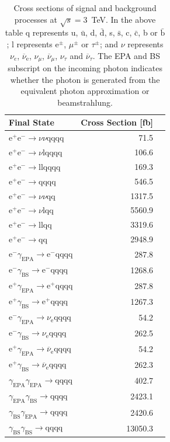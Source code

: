\begin{table}[h!]
\centering
\begin{tabular}{ l r r }
\hline
Final State & Cross Section [fb]  \\ 
\hline
$\text{e}^{+}\text{e}^{-} \rightarrow \nu{\nu}\text{qqqq}$ & 71.5 \\
$\text{e}^{+}\text{e}^{-} \rightarrow \nu\text{lqqqq}$ & 106.6 \\
$\text{e}^{+}\text{e}^{-} \rightarrow \text{llqqqq}$ & 169.3 \\
$\text{e}^{+}\text{e}^{-} \rightarrow \text{qqqq}$ & 546.5 \\
$\text{e}^{+}\text{e}^{-} \rightarrow \nu{\nu}\text{qq}$ & 1317.5 \\
$\text{e}^{+}\text{e}^{-} \rightarrow \nu\text{lqq}$ & 5560.9 \\
$\text{e}^{+}\text{e}^{-} \rightarrow \text{llqq}$ & 3319.6 \\
$\text{e}^{+}\text{e}^{-} \rightarrow \text{qq}$ & 2948.9 \\
$\text{e}^{-}\gamma_{\text{EPA}} \rightarrow \text{e}^{-}\text{qqqq}$ & 287.8 \\
$\text{e}^{-}\gamma_{\text{BS}} \rightarrow \text{e}^{-}\text{qqqq}$ & 1268.6 \\
$\text{e}^{+}\gamma_{\text{EPA}} \rightarrow \text{e}^{+}\text{qqqq}$ & 287.8 \\
$\text{e}^{+}\gamma_{\text{BS}} \rightarrow \text{e}^{+}\text{qqqq}$ & 1267.3 \\
$\text{e}^{-}\gamma_{\text{EPA}} \rightarrow \nu_{\text{e}}\text{qqqq}$ & 54.2 \\
$\text{e}^{-}\gamma_{\text{BS}} \rightarrow \nu_{\text{e}}\text{qqqq}$ & 262.5 \\
$\text{e}^{+}\gamma_{\text{EPA}} \rightarrow \overline{\nu}_{\text{e}}\text{qqqq}$ & 54.2 \\
$\text{e}^{+}\gamma_{\text{BS}} \rightarrow \overline{\nu}_{\text{e}}\text{qqqq}$ & 262.3 \\
$\gamma_{\text{EPA}}\gamma_{\text{EPA}} \rightarrow \text{qqqq}$ & 402.7 \\
$\gamma_{\text{EPA}}\gamma_{\text{BS}} \rightarrow \text{qqqq}$ & 2423.1 \\
$\gamma_{\text{BS}}\gamma_{\text{EPA}} \rightarrow \text{qqqq}$ & 2420.6 \\
$\gamma_{\text{BS}}\gamma_{\text{BS}} \rightarrow \text{qqqq}$ & 13050.3 \\
\hline
\end{tabular}
\caption[Cross sections of signal and background processes at $\sqrt{s}=3$~TeV]{Cross sections of signal and background processes at $\sqrt{s}=3$~TeV.  In the above table q represents u, $\bar{\text{u}}$, d, $\bar{\text{d}}$, s, $\bar{\text{s}}$, c, $\bar{\text{c}}$, b or $\bar{\text{b}}$;  l represents $\text{e}^{\pm}$, $\mu^{\pm}$ or $\tau^{\pm}$; and $\nu$ represents $\nu_{e}$, $\overline{\nu}_{\text{e}}$, $\nu_{\mu}$, $\overline{\nu}_{\mu}$, $\nu_{\tau}$ and $\overline{\nu}_{\tau}$.  The EPA and BS subscript on the incoming photon indicates whether the photon is generated from the equivalent photon approximation or beamstrahlung.}
\label{table:crosssection3000GeV}
\end{table}

